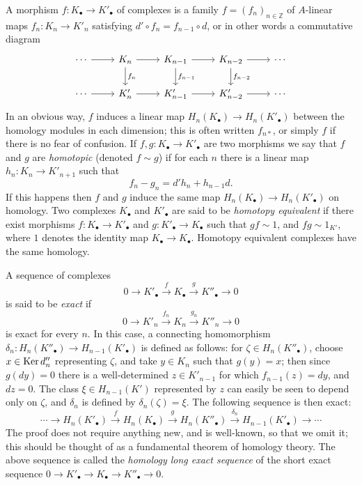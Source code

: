 A morphism $f\colon K_\bullet \to K'_\bullet$ of complexes is a family $f = (f_n)_{n \in \mathbb{Z}}$ of
$A$-linear maps $f_n\colon K_n \to K'_n$ satisfying $d' \circ f_n = f_{n-1} \circ d$, or in other
words a commutative diagram
\[
\begin{tikzcd}
\cdots \arrow[r] & K_n \arrow[r] \arrow[d, "f_n"] & K_{n-1} \arrow[r] \arrow[d, "f_{n-1}"] & K_{n-2} \arrow[r] \arrow[d, "f_{n-2}"] & \cdots \\
\cdots \arrow[r] & K'_n \arrow[r] & K'_{n-1} \arrow[r] & K'_{n-2} \arrow[r] & \cdots
\end{tikzcd}
\]
In an obvious way, $f$ induces a linear map $H_n(K_\bullet) \to H_n(K'_\bullet)$ between the
homology modules in each dimension; this is often written $f_{n*}$, or simply $f$
if there is no fear of confusion. If $f, g\colon K_\bullet \to K'_\bullet$ are two morphisms we say
that $f$ and $g$ are \emph{homotopic} (denoted $f \sim g$) if for each $n$ there is a linear map
$h_n\colon K_n \to K'_{n+1}$ such that
\[
  f_n - g_n = d'h_n + h_{n-1}d.
\]
If this happens then $f$ and $g$ induce the same map $H_n(K_\bullet) \to H_n(K'_\bullet)$ on
homology. Two complexes $K_\bullet$ and $K'_\bullet$ are said to be \emph{homotopy equivalent} if
there exist morphisms $f\colon K_\bullet \to K'_\bullet$ and $g\colon K'_\bullet \to K_\bullet$ such that $gf \sim 1$,
and $fg \sim 1_{K'}$, where $1$ denotes the identity map $K_\bullet \to K_\bullet$. Homotopy
equivalent complexes have the same homology.

A sequence of complexes
\[
  0 \to K'_\bullet \xrightarrow{f} K_\bullet \xrightarrow{g} K''_\bullet \to 0
\]
is said to be \emph{exact} if
\[
  0 \to K'_n \xrightarrow{f_n} K_n \xrightarrow{g_n} K''_n \to 0
\]
is exact for every $n$. In this case, a connecting homomorphism
$\delta_n\colon H_n(K''_\bullet) \to H_{n-1}(K'_\bullet)$ is defined as follows: for $\zeta \in H_n(K''_\bullet)$, choose
$x \in \operatorname{Ker} d''_n$ representing $\zeta$, and take $y \in K_n$ such that $g(y) = x$; then since
$g(dy) = 0$ there is a well-determined $z \in K'_{n-1}$ for which $f_{n-1}(z) = dy$, and
$dz = 0$. The class $\xi \in H_{n-1}(K')$ represented by $z$ can easily be seen to depend
only on $\zeta$, and $\delta_n$ is defined by $\delta_n(\zeta) = \xi$. The following sequence is then
exact:
\[
  \cdots \to H_n(K'_\bullet) \xrightarrow{f} H_n(K_\bullet) \xrightarrow{g} H_n(K''_\bullet)
      \xrightarrow{\delta_n} H_{n-1}(K'_\bullet) \to \cdots
\]
The proof does not require anything new, and is well-known, so that we omit
it; this should be thought of as a fundamental theorem of homology theory.
The above sequence is called the \emph{homology long exact sequence} of the short exact
sequence $0 \to K'_\bullet \to K_\bullet \to K''_\bullet \to 0$.

